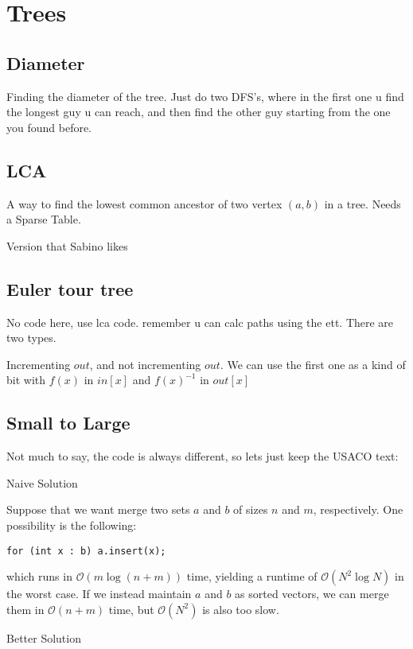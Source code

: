 \chapter{Trees}
    \section{Diameter}
    Finding the diameter of the tree. Just do two DFS's, where in the first one u find the longest guy u can reach, and then find the other guy starting from the one you found before.
    
    \section{LCA}
    A way to find the lowest common ancestor of two vertex $(a,b)$ in a tree. Needs a Sparse Table.
    
    Version that Sabino likes
    

    
    \section{Euler tour tree}

    No code here, use lca code. remember u can calc paths using the ett. There are two types.
    
    Incrementing $out$, and not incrementing $out$. We can use the first one as a kind of bit with $f(x)$ in $in[x]$ and $f(x)^{-1}$ in $out[x]$
    
    \section{Small to Large}

    Not much to say, the code is always different, so lets just keep the USACO text:

    Naive Solution

    Suppose that we want merge two sets $a$ and $b$ of sizes $n$ and $m$,
    respectively. One possibility is the following:
    
    \lstinline{for (int x : b) a.insert(x);}
    
    which runs in $\mathcal{O}(m\log (n+m))$ time, yielding a runtime of
    $\mathcal{O}(N^2\log N)$ in the worst case. If we instead maintain $a$ and $b$
    as sorted vectors, we can merge them in $\mathcal{O}(n+m)$ time, but
    $\mathcal{O}(N^2)$ is also too slow.
    
    Better Solution
    
